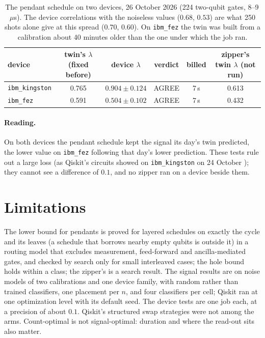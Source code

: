 \documentclass[11pt]{article}
\begin{document}
\begin{table}[h]
\centering
\small
\begin{tabular}{lccccc}
\toprule
device & twin's $\lambda$ (fixed before) & device $\lambda$ & verdict & billed & zipper's twin $\lambda$ (not run) \\
\midrule
\texttt{ibm\_kingston} & 0.765 & $0.904 \pm 0.124$ & AGREE & 7\,s & 0.613 \\
\texttt{ibm\_fez} & 0.591 & $0.504 \pm 0.102$ & AGREE & 7\,s & 0.432 \\
\bottomrule
\end{tabular}
\caption{The pendant schedule on two devices, 26 October 2026 (224 two-qubit gates, 8--9\,$\mu$s). The device
correlations with the noiseless values ($0.68$, $0.53$) are what 250 shots alone give at this spread ($0.70$, $0.60$).
On \texttt{ibm\_fez} the twin was built from a calibration about 40 minutes older than the one under which the job ran.}
\label{tab:device}
\end{table}

\paragraph{Reading.} On both devices the pendant schedule kept the signal its day's twin predicted, the lower value on
\texttt{ibm\_fez} following that day's lower prediction. These tests rule out a large loss (as Qiskit's circuits showed
on \texttt{ibm\_kingston} on 24 October \cite{paper3}); they cannot see a difference of $0.1$, and no zipper ran on a
device beside them.

\section{Limitations}

The lower bound for pendants is proved for layered schedules on exactly the cycle and its leaves (a schedule that
borrows nearby empty qubits is outside it) in a routing model that excludes measurement,
feed-forward and ancilla-mediated gates, and checked by search only for small interleaved cases; the hole bound holds within a class; the zipper's is a search result. The signal results are on noise models of
two calibrations and one device family, with random rather than trained classifiers, one placement per $n$, and four
classifiers per cell; Qiskit ran at one optimization level with its default seed. The device tests are one job each, at a precision of about $0.1$. Qiskit's structured swap strategies \cite{weidenfeller2022} were not among the arms. Count-optimal is not
signal-optimal: duration and where the read-out sits also matter.
\end{document}
